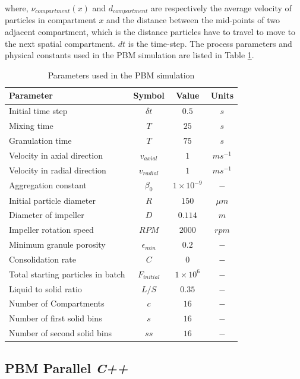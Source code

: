 \documentclass[preprint,11pt,authoryear]{elsarticle}
\begin{document}
where, $\nu_{compartment}(x)$ and $d_{compartment}$ are respectively the average velocity of 
particles in compartment $x$ and the distance between the mid-points of two adjacent compartment, 
which is the distance particles have to travel to move to the next spatial compartment. $dt$ is the 
time-step.
The process parameters and physical constants used in the PBM simulation are listed in Table 
\ref{table:mthds_pbm_parameters}.
\begin{table}
\caption{Parameters used in the PBM simulation}
\label{table:mthds_pbm_parameters}
\begin{center}
\begin{tabular}{l|c|c|c}
\hline
\bf{Parameter} &\bf{Symbol} &\bf{Value} &\bf{Units}\\
\hline
Initial time step & $\delta t$ & $0.5$ & $s$\\
Mixing time & $T$ & $25$ & $s$\\
Granulation time & $T$ & $75$ & $s$\\
Velocity in axial direction & $v_{axial}$ & $1$ & $ms^{-1}$\\
Velocity in radial direction & $v_{radial}$ & $1$ & $ms^{-1}$\\
Aggregation constant & $\beta_0$ & $1\times10^{-9}$ & $-$\\
Initial particle diameter & $R$ & $150$ & $\mu m$\\
Diameter of impeller & $D$ & $0.114$ & $m$ \\
Impeller rotation speed & $RPM$ & $2000$ & $rpm$\\
Minimum granule porosity & $\epsilon_{min}$ & $0.2$ & $-$\\
Consolidation rate & $C$ & $0$ & $-$\\
Total starting particles in batch & $F_{initial}$ & $1 \times 10^{6}$ & $-$\\
Liquid to solid ratio & $L/S$ & $0.35$ & $-$ \\
Number of Compartments & $c$ & $16$ & $-$ \\
Number of first solid bins & $s$ & $16$ & $-$\\
Number of second solid bins & $ss$ & $16$ & $-$\\
\hline
\end{tabular}
\end{center}
\end{table}


\subsection{PBM Parallel \textit{C++}}
\end{document}
